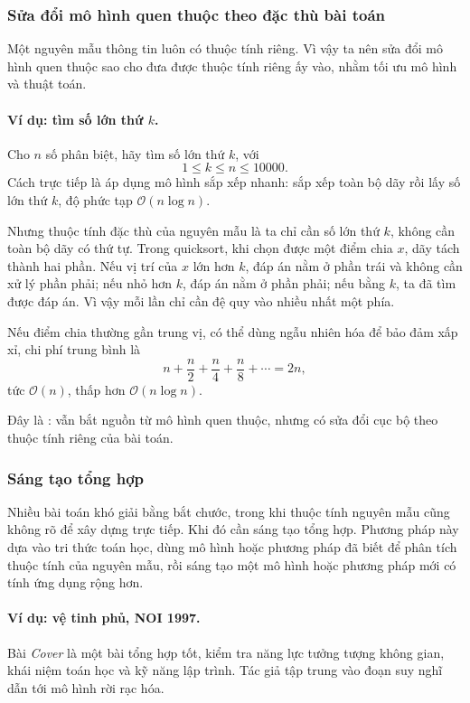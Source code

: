 \documentclass[11pt]{article}
\newcommand{\Oh}{\mathcal{O}}
\begin{document}
\subsubsection{Sửa đổi mô hình quen thuộc theo đặc thù bài toán}

Một nguyên mẫu thông tin luôn có thuộc tính riêng. Vì vậy ta nên sửa đổi mô
hình quen thuộc sao cho đưa được thuộc tính riêng ấy vào, nhằm tối ưu mô hình
và thuật toán.

\paragraph{Ví dụ: tìm số lớn thứ \(k\).}
Cho \(n\) số phân biệt, hãy tìm số lớn thứ \(k\), với
\[
  1\le k\le n\le 10000.
\]
Cách trực tiếp là áp dụng mô hình sắp xếp nhanh: sắp xếp toàn bộ dãy rồi lấy
số lớn thứ \(k\), độ phức tạp \(\Oh(n\log n)\).

Nhưng thuộc tính đặc thù của nguyên mẫu là ta chỉ cần số lớn thứ \(k\), không
cần toàn bộ dãy có thứ tự. Trong quicksort, khi chọn được một điểm chia \(x\),
dãy tách thành hai phần. Nếu vị trí của \(x\) lớn hơn \(k\), đáp án nằm ở
phần trái và không cần xử lý phần phải; nếu nhỏ hơn \(k\), đáp án nằm ở phần
phải; nếu bằng \(k\), ta đã tìm được đáp án. Vì vậy mỗi lần chỉ cần đệ quy
vào nhiều nhất một phía.

Nếu điểm chia thường gần trung vị, có thể dùng ngẫu nhiên hóa để bảo đảm xấp
xỉ, chi phí trung bình là
\[
  n+\frac n2+\frac n4+\frac n8+\cdots = 2n,
\]
tức \(\Oh(n)\), thấp hơn \(\Oh(n\log n)\).

Đây là : vẫn bắt nguồn từ mô hình quen thuộc, nhưng
có sửa đổi cục bộ theo thuộc tính riêng của bài toán.

\subsubsection{Sáng tạo tổng hợp}

Nhiều bài toán khó giải bằng bắt chước, trong khi thuộc tính nguyên mẫu cũng
không rõ để xây dựng trực tiếp. Khi đó cần sáng tạo tổng hợp. Phương pháp này
dựa vào tri thức toán học, dùng mô hình hoặc phương pháp đã biết để phân tích
thuộc tính của nguyên mẫu, rồi sáng tạo một mô hình hoặc phương pháp mới có
tính ứng dụng rộng hơn.

\paragraph{Ví dụ: vệ tinh phủ, NOI 1997.}
Bài \textit{Cover} là một bài tổng hợp tốt, kiểm tra năng lực tưởng tượng
không gian, khái niệm toán học và kỹ năng lập trình. Tác giả tập trung vào
đoạn suy nghĩ dẫn tới mô hình rời rạc hóa.
\end{document}
